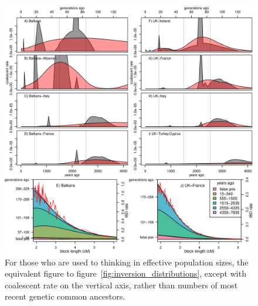 \documentclass{article}
\begin{document}
\begin{figure}[!htp]
  \begin{center}
    \includegraphics{inversion-distributions-coalrate}
    \caption{
    For those who are used to thinking in effective population sizes,
    the equivalent figure to figure~\ref{fig:inversion_distributions},
    except with coalescent rate on the vertical axis, 
    rather than numbers of most recent genetic common ancestors.
    \label{sfig:inversion_distributions_coal}
    }
  \end{center}
\end{figure}
\end{document}
